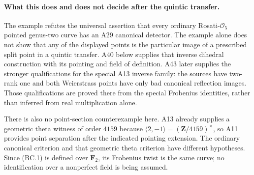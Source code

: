 \paragraph{What this does and does not decide after the quintic transfer.}
The example refutes the universal assertion that every ordinary
Rosati-$\mathcal O_5$ pointed genus-two curve has an A29
canonical detector. The example alone does not show that any of the
displayed points is the particular image of a prescribed split
point in a quintic transfer. A40 below supplies that inverse
dihedral construction with its pointing and field of definition.
A43 later supplies the stronger qualifications for the special
A13 inverse family: the sources have two-rank one and both
Weierstrass points have only bad canonical reflection images.
Those qualifications are proved there from the special Frobenius
identities, rather than inferred from real multiplication alone.

There is also no point-section counterexample here. A13 already
supplies a geometric theta witness of order $4159$ because
$\langle2,-1\rangle=(\mathbf Z/4159)^\times$, so A11
provides point separation after the indicated pointing extension.
The ordinary canonical criterion and that geometric theta
criterion have different hypotheses. Since (BC.1) is defined
over $\mathbf F_2$, its Frobenius twist is the same curve;
no identification over a nonperfect field is being assumed.
